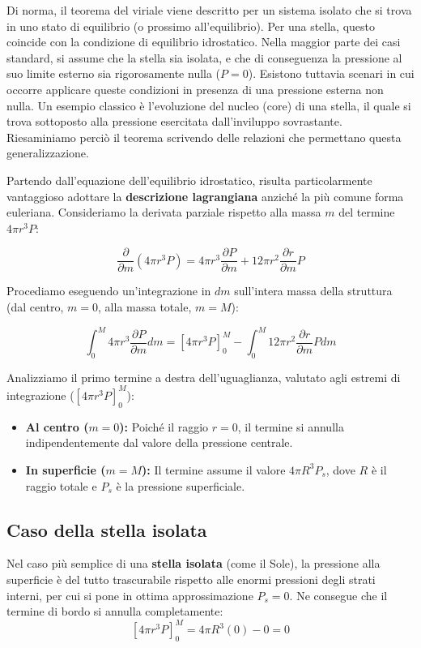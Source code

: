 Di norma, il teorema del viriale viene descritto per un sistema isolato che si trova in uno stato di equilibrio (o prossimo all'equilibrio). Per una stella, questo coincide con la condizione di equilibrio idrostatico. Nella maggior parte dei casi standard, si assume che la stella sia isolata, e che di conseguenza la pressione al suo limite esterno sia rigorosamente nulla ($P=0$).
Esistono tuttavia scenari in cui occorre applicare queste condizioni in presenza di una pressione esterna non nulla. Un esempio classico è l'evoluzione del nucleo (core) di una stella, il quale si trova sottoposto alla pressione esercitata dall'inviluppo sovrastante. Riesaminiamo perciò il teorema scrivendo delle relazioni che permettano questa generalizzazione.

Partendo dall'equazione dell'equilibrio idrostatico, risulta particolarmente vantaggioso adottare la \textbf{descrizione lagrangiana} anziché la più comune forma euleriana.
Consideriamo la derivata parziale rispetto alla massa $m$ del termine $4\pi r^3 P$:

\begin{equation}
\frac{\partial}{\partial m} \left( 4\pi r^3 P \right) = 4\pi r^3 \frac{\partial P}{\partial m} + 12\pi r^2 \frac{\partial r}{\partial m} P
\end{equation}

Procediamo eseguendo un'integrazione in $dm$ sull'intera massa della struttura (dal centro, $m=0$, alla massa totale, $m=M$):

\begin{equation}
\int_0^M 4\pi r^3 \frac{\partial P}{\partial m} dm = \left[ 4\pi r^3 P \right]_0^M - \int_0^M 12\pi r^2 \frac{\partial r}{\partial m} P dm
\end{equation}

Analizziamo il primo termine a destra dell'uguaglianza, valutato agli estremi di integrazione ($\left[ 4\pi r^3 P \right]_0^M$):
\begin{itemize}
\item \textbf{Al centro ($m=0$):} Poiché il raggio $r=0$, il termine si annulla indipendentemente dal valore della pressione centrale.
\item \textbf{In superficie ($m=M$):} Il termine assume il valore $4\pi R^3 P_s$, dove $R$ è il raggio totale e $P_s$ è la pressione superficiale.
\end{itemize}

\subsection{Caso della stella isolata}
Nel caso più semplice di una \textbf{stella isolata} (come il Sole), la pressione alla superficie è del tutto trascurabile rispetto alle enormi pressioni degli strati interni, per cui si pone in ottima approssimazione $P_s = 0$.
Ne consegue che il termine di bordo si annulla completamente:
\begin{equation}
\left[ 4\pi r^3 P \right]_0^M = 4\pi R^3 (0) - 0 = 0
\end{equation}

